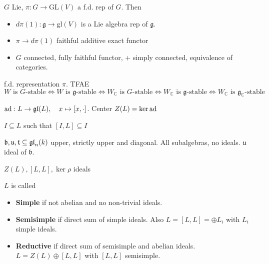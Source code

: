 \begin{proposition} $G$ Lie, $\pi : G \to \text{GL}(V)$ a f.d. rep of $G$. Then
\begin{itemize}[topsep=-6pt, itemsep=0pt]
    \item $d \pi(1) : \mathfrak{g} \to \text{gl}(V)$ is a Lie algebra rep of $\mathfrak{g}$.
    \item $\pi \to d\pi (1)$ faithful additive exact functor 
    \item $G$ connected, fully faithful functor, + simply connected, equivalence of categories.
\end{itemize}
\end{proposition}

\begin{proposition} f.d. representation $\pi $. TFAE
\[
W \text{ is } G \text{-stable} \iff W \text{ is } \mathfrak{g} \text{-stable} \iff W_{\mathbb{C}} \text{ is } G \text{-stable} \iff W_{\mathbb{C}} \text{ is } \mathfrak{g} \text{-stable} \iff W_{\mathbb{C}} \text{ is } \mathfrak{g}_{\mathbb{C}} \text{-stable}
\]
\end{proposition}

\begin{definition} $\operatorname{ad} :L \to \mathfrak{gl} (L), \quad x \mapsto [x, \cdot]$. Center $Z(L) = \ker \operatorname{ad}$ 
\end{definition}

\begin{definition}[Ideal] $I \subseteq L$ such that $[I, L] \subseteq I$ 
\end{definition}

\begin{example} 
    $\mathfrak{b},\mathfrak{u}, \mathfrak{t} \subseteq \operatorname{\mathfrak{g}\mathfrak{l}}_n(k)$
     upper, strictly upper and diagonal. All subalgebras, no ideals. $\mathfrak{u}$ ideal of $\mathfrak{b}$.
\end{example}

\begin{proposition} $Z(L), [L, L], \ker \rho$ ideals
\end{proposition}

\begin{definition} $L$ is called
\begin{itemize}[topsep=-6pt, itemsep=0pt]
    \item \textbf{Simple} if not abelian and no non-trivial ideals.
    \item \textbf{Semisimple} if direct sum of simple ideals. Also $L = [L,L] = \oplus L_i$ with $L_i$ simple ideals.
    \item \textbf{Reductive} if direct sum of semisimple and abelian ideals. $L = Z(L) \oplus [L,L]$ with $[L,L]$ semisimple.
\end{itemize}
\end{definition}

